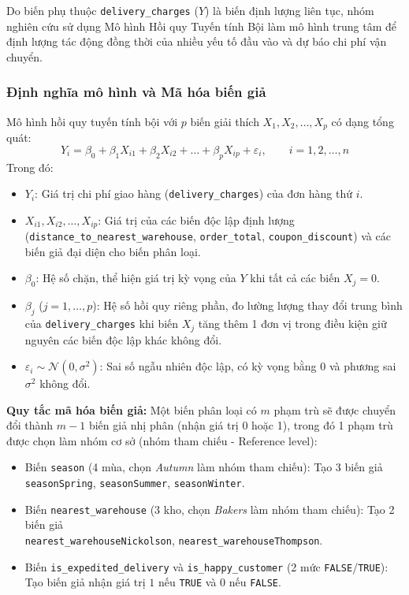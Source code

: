 	Do biến phụ thuộc \texttt{delivery\_charges} ($Y$) là biến định lượng liên tục, nhóm nghiên cứu sử dụng Mô hình Hồi quy Tuyến tính Bội làm mô hình trung tâm để định lượng tác động đồng thời của nhiều yếu tố đầu vào và dự báo chi phí vận chuyển.
	
	\subsubsection{Định nghĩa mô hình và Mã hóa biến giả}
	
	Mô hình hồi quy tuyến tính bội với $p$ biến giải thích $X_1, X_2, \dots, X_p$ có dạng tổng quát:
	\begin{equation}
		Y_i = \beta_0 + \beta_1 X_{i1} + \beta_2 X_{i2} + \dots + \beta_p X_{ip} + \varepsilon_i, \qquad i = 1, 2, \dots, n
	\end{equation}
	Trong đó:
	\begin{itemize}
		\item $Y_i$: Giá trị chi phí giao hàng (\texttt{delivery\_charges}) của đơn hàng thứ $i$.
		\item $X_{i1}, X_{i2}, \dots, X_{ip}$: Giá trị của các biến độc lập định lượng (\texttt{distance\_to\_nearest\_warehouse}, \texttt{order\_total}, \texttt{coupon\_discount}) và các biến giả đại diện cho biến phân loại.
		\item $\beta_0$: Hệ số chặn, thể hiện giá trị kỳ vọng của $Y$ khi tất cả các biến $X_j = 0$.
		\item $\beta_j$ ($j = 1, \dots, p$): Hệ số hồi quy riêng phần, đo lường lượng thay đổi trung bình của \texttt{delivery\_charges} khi biến $X_j$ tăng thêm 1 đơn vị trong điều kiện giữ nguyên các biến độc lập khác không đổi.
		\item $\varepsilon_i \sim \mathcal{N}(0, \sigma^2)$: Sai số ngẫu nhiên độc lập, có kỳ vọng bằng 0 và phương sai $\sigma^2$ không đổi.
	\end{itemize}
	
	\textbf{Quy tắc mã hóa biến giả:} Một biến phân loại có $m$ phạm trù sẽ được chuyển đổi thành $m - 1$ biến giả nhị phân (nhận giá trị 0 hoặc 1), trong đó 1 phạm trù được chọn làm nhóm cơ sở (nhóm tham chiếu - Reference level):
	\begin{itemize}
		\item Biến \texttt{season} (4 mùa, chọn \textit{Autumn} làm nhóm tham chiếu): Tạo 3 biến giả \texttt{seasonSpring}, \texttt{seasonSummer}, \texttt{seasonWinter}.
		\item Biến \texttt{nearest\_warehouse} (3 kho, chọn \textit{Bakers} làm nhóm tham chiếu): Tạo 2 biến giả \\ \texttt{nearest\_warehouseNickolson}, \texttt{nearest\_warehouseThompson}.
		\item Biến \texttt{is\_expedited\_delivery} và \texttt{is\_happy\_customer} (2 mức \texttt{FALSE}/\texttt{TRUE}): Tạo biến giả nhận giá trị $1$ nếu \texttt{TRUE} và $0$ nếu \texttt{FALSE}.
	\end{itemize}
	

